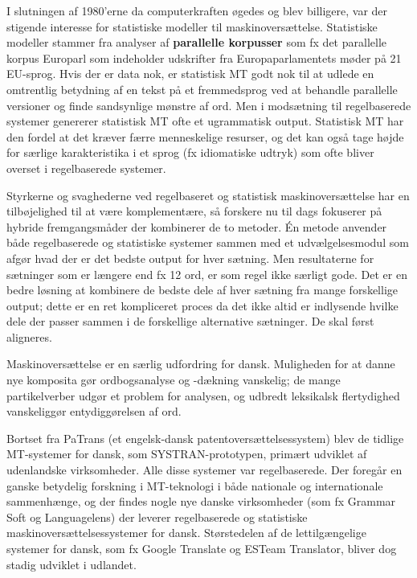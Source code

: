 \begin{multicols}{2}
I slutningen af 1980'erne da computerkraften \o gedes og blev billigere, var der stigende interesse for stati\-stiske modeller til maskinovers\ae ttelse. Statistiske mo\-deller stammer fra analyser af {\bf parallelle korpusser} som fx det parallelle korpus Europarl som indeholder udskrifter fra Europaparlamentets m\o der \mbox{p\aa} 21 EU-sprog. Hvis der er data nok, er statistisk MT godt nok til at udlede en omtrentlig betydning af en tekst \mbox{p\aa} et fremmedsprog ved at behandle parallelle versioner og finde sandsynlige m\o nstre af ord. Men i mods\ae tning til regelbaserede sy\-stemer genererer statistisk MT ofte et ugrammatisk output. Statistisk MT har den fordel at det kr\ae ver f\ae rre menneskelige resurser, og det kan \mbox{ogs\aa} tage h\o jde for s\ae rlige karakteristika i et sprog (fx idiomatiske udtryk) som ofte bliver overset i regelbaserede systemer. 

Styrkerne og svaghederne ved regelbaseret og statistisk maskinovers\ae ttelse har en tilb\o jelighed til at v\ae re komplement\ae re, \mbox{s\aa} forskere nu til dags fokuserer \mbox{p\aa} hybride fremgangsm\aa der der kombinerer de to metoder. \'{E}n metode anvender b\aa de regelbaserede og statistiske systemer sammen med et udv\ae lgelsesmodul som afg\o r hvad der er det bedste output for hver s\ae tning. Men resultaterne for s\ae tninger som er l\ae ngere end fx 12 ord, er som regel ikke s\ae rligt gode. Det er en bedre l\o sning at kombinere de bedste dele af hver s\ae tning fra mange forskellige output; dette er en ret kompliceret proces da det ikke altid er indlysende hvilke dele der passer sammen i de forskellige alternative s\ae tninger. De skal f\o rst aligneres.

Maskinovers\ae ttelse er en s\ae rlig udfordring for dansk. Muligheden for at danne nye komposita g\o r ordbogsanalyse og -d\ae kning vanskelig; de mange partikelverber udg\o r et problem for analysen, og udbredt leksikalsk flertydighed vanskeligg\o r  entydigg\o relsen af ord. 

Bortset fra PaTrans (et engelsk-dansk patentovers\ae ttelsessystem) blev de tidlige MT-systemer for dansk, som SYSTRAN-prototypen, prim\ae rt udviklet af udenlandske virksomheder. Alle disse systemer var regelbaserede. Der foreg\aa r en ganske betydelig forsk\-ning i MT-teknologi i b\aa de nationale og internationale sammenh\ae nge, og der findes nogle nye danske virksomheder (som fx Grammar Soft  og Languagelens) der leverer regelbaserede og statistiske maskinovers\ae ttelsessystemer for dansk. St\o rstedelen af de lettilg\ae ngelige systemer for dansk, som fx Google Translate og ESTeam Translator, bliver dog stadig udviklet i udlandet.


\end{multicols}
